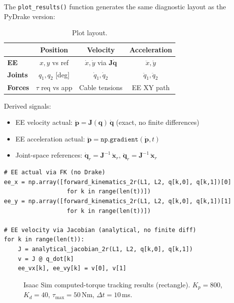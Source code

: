 \documentclass[11pt,a4paper]{article}
\newcommand{\bq}{\bm{q}}
\newcommand{\bdq}{\dot{\bm{q}}}
\newcommand{\bddq}{\ddot{\bm{q}}}
\newcommand{\bJ}{\bm{J}}
\newcommand{\bx}{\bm{x}}
\begin{document}
The \texttt{plot\_results()} function generates the same diagnostic layout as the PyDrake version:

\begin{table}[h]
\centering
\caption{Plot layout.}
\begin{tabular}{lccc}
\toprule
 & \textbf{Position} & \textbf{Velocity} & \textbf{Acceleration} \\
\midrule
\textbf{EE}     & $x, y$ vs ref      & $\dot x, \dot y$ via $\bJ\bdq$ & $\ddot x, \ddot y$ \\
\textbf{Joints}  & $q_1, q_2$ [deg]  & $\dot q_1, \dot q_2$           & $\ddot q_1, \ddot q_2$ \\
\textbf{Forces}  & $\tau$ req vs app  & Cable tensions                 & EE XY path \\
\bottomrule
\end{tabular}
\end{table}

Derived signals:
\begin{itemize}[leftmargin=2em]
    \item EE velocity actual: $\dot{\bm{p}} = \bJ(\bq)\,\bdq$ (exact, no finite differences)
    \item EE acceleration actual: $\ddot{\bm{p}} = \texttt{np.gradient}(\dot{\bm{p}}, t)$
    \item Joint-space references: $\bdq_r = \bJ^{-1}\,\dot{\bx}_r$, $\bddq_r = \bJ^{-1}\,\ddot{\bx}_r$
\end{itemize}

\begin{lstlisting}[caption={FK-based EE actual computation --- \texttt{plot\_results()}}]
# EE actual via FK (no Drake)
ee_x = np.array([forward_kinematics_2r(L1, L2, q[k,0], q[k,1])[0]
                  for k in range(len(t))])
ee_y = np.array([forward_kinematics_2r(L1, L2, q[k,0], q[k,1])[1]
                  for k in range(len(t))])

# EE velocity via Jacobian (analytical, no finite diff)
for k in range(len(t)):
    J = analytical_jacobian_2r(L1, L2, q[k,0], q[k,1])
    v = J @ q_dot[k]
    ee_vx[k], ee_vy[k] = v[0], v[1]
\end{lstlisting}

\begin{figure}[H]
\centering
{}
\caption{Isaac Sim computed-torque tracking results (rectangle). $K_p = 800$, $K_d = 40$, $\tau_{\max} = 50$\,Nm, $\Delta t = 10$\,ms.}
\label{fig:results_isaac}
\end{figure}
\end{document}
